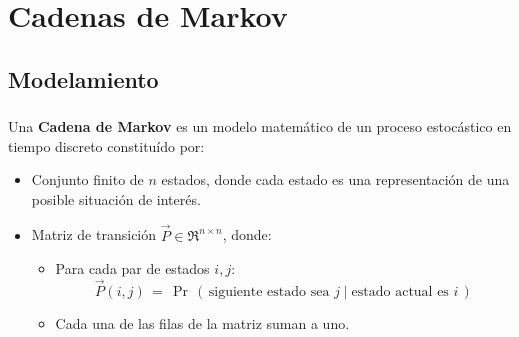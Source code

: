 \documentclass[ 10pt, xcolor = dvipsnames]{beamer}
\begin{document}
\section{Cadenas de Markov}

\subsection{Modelamiento}

\begin{frame}[allowframebreaks]
\frametitle{\insertsubsection}

Una \textbf{Cadena de Markov} es un modelo matem\'atico de un proceso estoc\'astico \linebreak en tiempo discreto constitu\'ido por: 
\begin{itemize}
\item Conjunto finito de $n$ estados, donde cada estado es una representaci\'on de una posible situaci\'on de inter\'es. 
\item Matriz de transici\'on $\vec{P} \in \Re^{n \times n}$, donde: 
\begin{itemize}
\item Para cada par de estados $i,j$: 
\[
\vec{P}(i,j) \, = \, 
\Pr \, ( \, 
\text{siguiente estado sea } j \mid
\text{estado actual es } i \, )
\]
\item Cada una de las filas de la matriz suman a uno. 
\end{itemize}
\end{itemize}

\end{frame}
\end{document}
